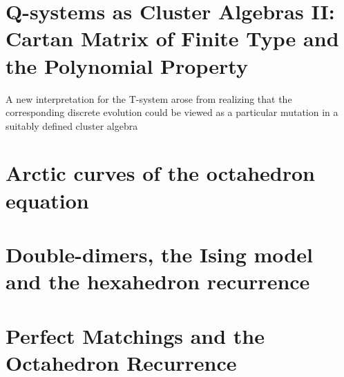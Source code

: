 \section{Q-systems as Cluster Algebras {II}: Cartan Matrix of Finite Type and the Polynomial Property \cite{Di_Francesco_2009}}
A new interpretation for the T-system arose from realizing that the corresponding discrete evolution could be viewed as a particular mutation in a suitably defined cluster algebra

\section{Arctic curves of the octahedron equation \cite{di2014arctic}}


\section{Double-dimers, the Ising model and the hexahedron recurrence \cite{kenyon2013double}}

\section{Perfect Matchings and the Octahedron Recurrence \cite{speyer2004perfect}}


